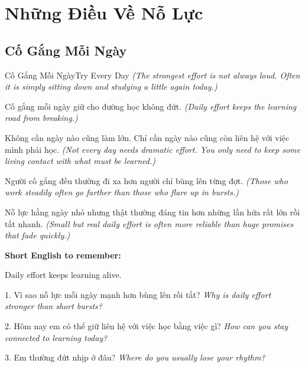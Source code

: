 \chapter{Những Điều Về Nỗ Lực}

\section{Cố Gắng Mỗi Ngày}
\begin{truyen}{Cố Gắng Mỗi Ngày}{Try Every Day}
\textit{(The strongest effort is not always loud. Often it is simply sitting down and studying a little again today.)}

Cố gắng mỗi ngày giữ cho đường học không đứt.
\textit{(Daily effort keeps the learning road from breaking.)}

Không cần ngày nào cũng làm lớn. Chỉ cần ngày nào cũng còn liên hệ với việc mình phải học.
\textit{(Not every day needs dramatic effort. You only need to keep some living contact with what must be learned.)}

Người cố gắng đều thường đi xa hơn người chỉ bùng lên từng đợt.
\textit{(Those who work steadily often go farther than those who flare up in bursts.)}
\end{truyen}

\begin{baihoc}
Nỗ lực hằng ngày nhỏ nhưng thật thường đáng tin hơn những lần hứa rất lớn rồi tắt nhanh.
\textit{(Small but real daily effort is often more reliable than huge promises that fade quickly.)}
\end{baihoc}

\begin{ghinhoanh}
\textbf{Short English to remember:}

Daily effort keeps learning alive.

\end{ghinhoanh}

\begin{tuhocnhanh}
1. Vì sao nỗ lực mỗi ngày mạnh hơn bùng lên rồi tắt? \textit{Why is daily effort stronger than short bursts?}

2. Hôm nay em có thể giữ liên hệ với việc học bằng việc gì? \textit{How can you stay connected to learning today?}

3. Em thường đứt nhịp ở đâu? \textit{Where do you usually lose your rhythm?}
\end{tuhocnhanh}
\ngancach

